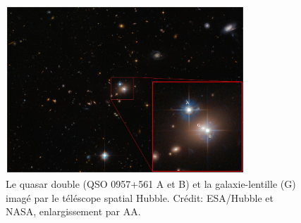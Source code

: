 \begin{figure}[htb!]
        \centering
        \includegraphics[width=0.8\textwidth]{figures/zoomed_in_qso0957}
        \caption{Le quasar double (QSO 0957+561 A et B) et la galaxie-lentille (G) imagé par le téléscope spatial Hubble. 
        Crédit: ESA/Hubble et NASA, enlargissement par AA.}
        \label{fig:doubel quasar}
\end{figure}




